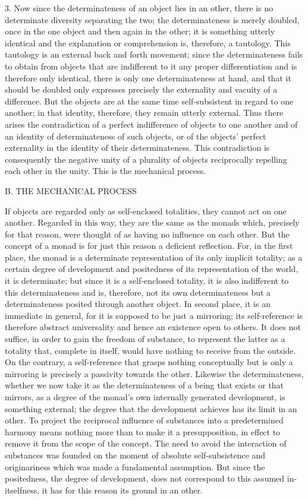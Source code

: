3. Now since the determinateness of an object lies in an other,
there is no determinate diversity separating the two;
the determinateness is merely doubled,
once in the one object and then again in the other;
it is something utterly identical
and the explanation or comprehension is,
therefore, a tautology.
This tautology is an external back and forth movement;
since the determinateness fails to obtain from objects
that are indifferent to it any proper differentiation
and is therefore only identical,
there is only one determinateness at hand,
and that it should be doubled only expresses
precisely the externality and vacuity of a difference.
But the objects are at the same time
self-subsistent in regard to one another;
in that identity, therefore, they remain utterly external.
Thus there arises the contradiction of
a perfect indifference of objects to one another
and of an identity of determinateness of such objects,
or of the objects' perfect externality
in the identity of their determinateness.
This contradiction is consequently the
negative unity of a plurality of objects
reciprocally repelling each other in the unity.
This is the mechanical process.

B. THE MECHANICAL PROCESS

If objects are regarded only as self-enclosed totalities,
they cannot act on one another.
Regarded in this way, they are the same as the monads
which, precisely for that reason, were thought of
as having no influence on each other.
But the concept of a monad is for just this reason
a deficient reflection.
For, in the first place, the monad is
a determinate representation of its only implicit totality;
as a certain degree of development and positedness of its
representation of the world, it is determinate;
but since it is a self-enclosed totality,
it is also indifferent to this determinateness
and is, therefore, not its own determinateness
but a determinateness posited through another object.
In second place, it is an immediate in general,
for it is supposed to be just a mirroring;
its self-reference is therefore abstract universality
and hence an existence open to others.
It does not suffice, in order to gain the freedom of substance,
to represent the latter as a totality that,
complete in itself, would have nothing to receive from the outside.
On the contrary, a self-reference that grasps nothing conceptually
but is only a mirroring is precisely a passivity towards the other.
Likewise the determinateness, whether we now take it as
the determinateness of a being that exists or that mirrors,
as a degree of the monad's own internally generated development,
is something external;
the degree that the development achieves has its limit in an other.
To project the reciprocal influence of substances
into a predetermined harmony means nothing more
than to make it a presupposition,
in effect to remove it from the scope of the concept.
The need to avoid the interaction of substances was founded
on the moment of absolute self-subsistence
and originariness which was made a fundamental assumption.
But since the positedness, the degree of development,
does not correspond to this assumed in-itselfness,
it has for this reason its ground in an other.

